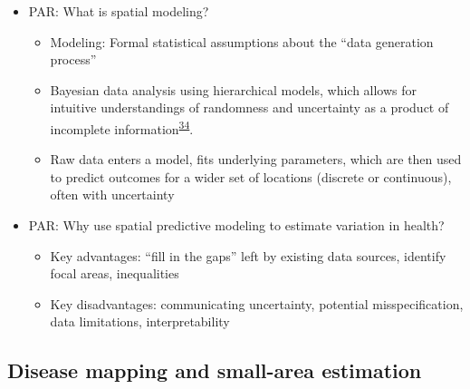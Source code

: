 \documentclass[
]{article}
\providecommand{\tightlist}{%
  \setlength{\itemsep}{0pt}\setlength{\parskip}{0pt}}
\begin{document}
\begin{itemize}
\tightlist
\item
  PAR: What is spatial modeling?

  \begin{itemize}
  \tightlist
  \item
    Modeling: Formal statistical assumptions about the ``data generation process''
  \item
    Bayesian data analysis using hierarchical models, which allows for intuitive understandings
    of randomness and uncertainty as a product of incomplete information\textsuperscript{\protect\hyperlink{ref-McElreath2016}{34}}.
  \item
    Raw data enters a model, fits underlying parameters, which are then used to predict
    outcomes for a wider set of locations (discrete or continuous), often with uncertainty
  \end{itemize}
\item
  PAR: Why use spatial predictive modeling to estimate variation in health?

  \begin{itemize}
  \tightlist
  \item
    Key advantages: ``fill in the gaps'' left by existing data sources, identify focal areas, inequalities
  \item
    Key disadvantages: communicating uncertainty, potential misspecification, data limitations, interpretability
  \end{itemize}
\end{itemize}

\hypertarget{disease-mapping-and-small-area-estimation}{%
\subsection{Disease mapping and small-area estimation}\label{disease-mapping-and-small-area-estimation}}
\end{document}
